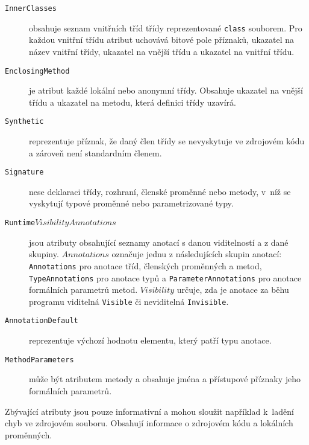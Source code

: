 \begin{description}

\item [\texttt{InnerClasses}] obsahuje seznam vnitřních tříd třídy reprezentované \texttt{class} souborem. Pro každou vnitřní třídu atribut uchovává bitové pole příznaků, ukazatel na název vnitřní třídy, ukazatel na vnější třídu a ukazatel na vnitřní třídu.

\item [\texttt{EnclosingMethod}] je atribut každé lokální nebo anonymní třídy. Obsahuje ukazatel na vnější třídu a ukazatel na metodu, která definici třídy uzavírá.

\item [\texttt{Synthetic}] reprezentuje příznak, že daný člen třídy se nevyskytuje ve zdrojovém kódu a zároveň není standardním členem.

\item [\texttt{Signature}] nese deklaraci třídy, rozhraní, členské proměnné nebo metody, v~níž se vyskytují typové proměnné nebo parametrizované typy.

\item [\texttt{Runtime}$Visibility$$Annotations$] jsou atributy obsahující seznamy anotací s danou viditelností a z dané skupiny. $Annotations$ označuje jednu z následujících skupin anotací: \texttt{Annotations} pro anotace tříd, členských proměnných a metod, \texttt{TypeAnnotations} pro anotace typů a \texttt{ParameterAnnotations} pro anotace formálních parametrů metod. $Visibility$ určuje, zda je anotace za běhu programu viditelná \texttt{Visible} či neviditelná \texttt{Invisible}. 

\item [\texttt{AnnotationDefault}] reprezentuje výchozí hodnotu elementu, který patří typu anotace.

\item [\texttt{MethodParameters}] může být atributem metody a obsahuje jména a přístupové příznaky jeho formálních parametrů.
\end{description}

Zbývající atributy jsou pouze informativní a mohou sloužit například k~ladění chyb ve zdrojovém souboru. Obsahují informace o zdrojovém kódu a lokálních proměnných.

